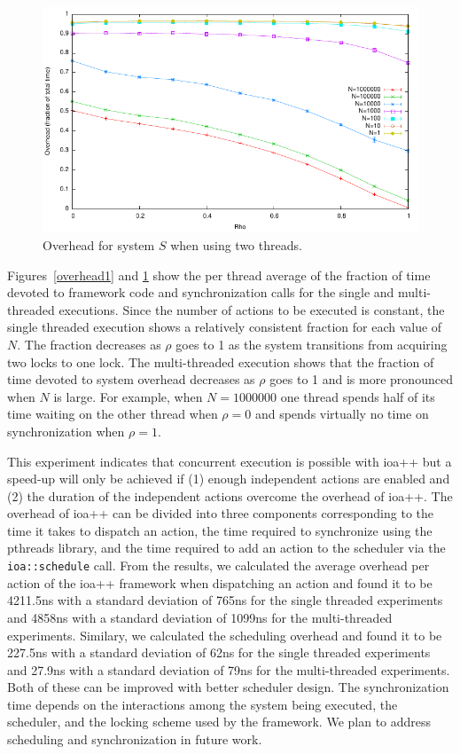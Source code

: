 \begin{figure}
\center
\includegraphics[width=\columnwidth]{overhead2}
\caption{Overhead for system $S$ when using two threads.\label{overhead2}}
\end{figure}

Figures~\ref{overhead1} and \ref{overhead2} show the per thread average of the fraction of time devoted to framework code and synchronization calls for the single and multi-threaded executions.
Since the number of actions to be executed is constant, the single threaded execution shows a relatively consistent fraction for each value of $N$.
The fraction decreases as $\rho$ goes to 1 as the system transitions from acquiring two locks to one lock.
The multi-threaded execution shows that the fraction of time devoted to system overhead decreases as $\rho$ goes to 1 and is more pronounced when $N$ is large.
For example, when $N=1000000$ one thread spends half of its time waiting on the other thread when $\rho = 0$ and spends virtually no time on synchronization when $\rho = 1$.

This experiment indicates that concurrent execution is possible with ioa++ but a speed-up will only be achieved if (1) enough independent actions are enabled and (2) the duration of the independent actions overcome the overhead of ioa++.
The overhead of ioa++ can be divided into three components corresponding to the time it takes to dispatch an action, the time required to synchronize using the pthreads library, and the time required to add an action to the scheduler via the \verb+ioa::schedule+ call.
From the results, we calculated the average overhead per action of the ioa++ framework when dispatching an action and found it to be 4211.5ns with a standard deviation of 765ns for the single threaded experiments and 4858ns with a standard deviation of 1099ns for the multi-threaded experiments.
Similary, we calculated the scheduling overhead and found it to be 227.5ns with a standard deviation of 62ns for the single threaded experiments and 27.9ns with a standard deviation of 79ns for the multi-threaded experiments.
Both of these can be improved with better scheduler design.
The synchronization time depends on the interactions among the system being executed, the scheduler, and the locking scheme used by the framework.
We plan to address scheduling and synchronization in future work.
